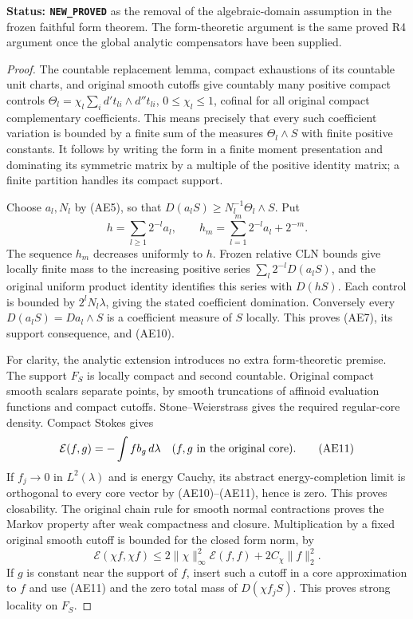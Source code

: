 \documentclass[11pt,a4paper]{article}
\numberwithin{equation}{section}
\theoremstyle{definition}
\theoremstyle{remark}
\begin{document}
\noindent\textbf{Status: \texttt{NEW\_PROVED}} as the removal of the
algebraic-domain assumption in the frozen faithful form theorem.
The form-theoretic argument is the same proved R4 argument once
the global analytic compensators have been supplied.

\begin{proof}
The countable replacement lemma, compact exhaustions of its
countable unit charts, and original smooth cutoffs give countably
many positive compact controls
$\Theta_l=\chi_l\sum_i d't_{li}\wedge d''t_{li}$, $0\leq\chi_l\leq1$,
cofinal for all original compact complementary coefficients.
This means precisely that every such coefficient variation is
bounded by a finite sum of the measures $\Theta_l\wedge S$
with finite positive constants.  It follows by writing the form
in a finite moment presentation and dominating its symmetric
matrix by a multiple of the positive identity matrix; a finite
partition handles its compact support.

Choose $a_l,N_l$ by (AE5), so that
$D(a_lS)\geq N_l^{-1}\Theta_l\wedge S$.  Put
\[
 h=\sum_{l\geq1}2^{-l}a_l,\qquad
 h_m=\sum_{l=1}^m2^{-l}a_l+2^{-m}.
\]
The sequence $h_m$ decreases uniformly to $h$.  Frozen relative
CLN bounds give locally finite mass to the increasing positive
series $\sum_l2^{-l}D(a_lS)$, and the original uniform product
identity identifies this series with $D(hS)$.  Each control is
bounded by $2^lN_l\lambda$, giving the stated coefficient
domination.  Conversely every $D(a_lS)=Da_l\wedge S$ is a
coefficient measure of $S$ locally.  This proves (AE7), its
support consequence, and (AE10).

For clarity, the analytic extension introduces no extra
form-theoretic premise.  The support $F_S$ is locally compact
and second countable.  Original compact smooth scalars separate
points, by smooth truncations of affinoid evaluation functions
and compact cutoffs.  Stone--Weierstrass gives the required
regular-core density.  Compact Stokes gives
\[
                  \mathcal E(f,g)=-\int f b_g\,d\lambda
                      \quad(f,g\hbox{ in the original core}).
 \tag{AE11}
\]
If $f_j\to0$ in $L^2(\lambda)$ and is energy Cauchy, its abstract
energy-completion limit is orthogonal to every core vector by
(AE10)--(AE11), hence is zero.  This proves closability.
The original chain rule for smooth normal contractions proves
the Markov property after weak compactness and closure.
Multiplication by a fixed original smooth cutoff is bounded
for the closed form norm, by
\[
 \mathcal E(\chi f,\chi f)
   \leq2\|\chi\|_\infty^2\mathcal E(f,f)
                              +2C_\chi\|f\|_2^2.
 \tag{AE12}
\]
If $g$ is constant near the support of $f$, insert such a cutoff
in a core approximation to $f$ and use (AE11) and the zero total
mass of $D(\chi f_jS)$.  This proves strong locality on $F_S$.


\end{proof}
\end{document}
